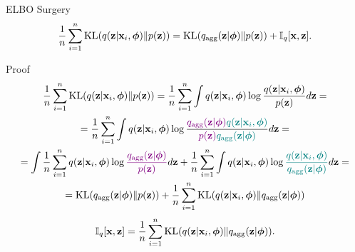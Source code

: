 \documentclass{beamer}
\begin{document}
\begin{frame}{ELBO Surgery}
		\vspace{-0.4cm}
		\[
		    \frac{1}{n} \sum_{i=1}^n \mathrm{KL}(q(\mathbf{z} | \mathbf{x}_i, \boldsymbol{\phi}) \| p(\mathbf{z})) = \mathrm{KL}(q_{\text{agg}}(\mathbf{z} | \boldsymbol{\phi}) \| p(\mathbf{z})) + \mathbb{I}_q [\mathbf{x}, \mathbf{z}].
		\]
		\vspace{-0.3cm}
	\begin{block}{Proof}
		\vspace{-0.5cm}
		{\footnotesize
		\begin{multline*}
		    \frac{1}{n} \sum_{i=1}^n \mathrm{KL}(q(\mathbf{z} | \mathbf{x}_i, \boldsymbol{\phi}) \| p(\mathbf{z})) = \frac{1}{n} \sum_{i=1}^n \int q(\mathbf{z} | \mathbf{x}_i, \boldsymbol{\phi}) \log \frac{q(\mathbf{z} | \mathbf{x}_i, \boldsymbol{\phi})}{p(\mathbf{z})} d \mathbf{z} = \\
		    = \frac{1}{n} \sum_{i=1}^n \int q(\mathbf{z} | \mathbf{x}_i, \boldsymbol{\phi}) \log \frac{{\color{violet}q_{\text{agg}}(\mathbf{z} | \boldsymbol{\phi})} {\color{teal}q(\mathbf{z} | \mathbf{x}_i, \boldsymbol{\phi})}}{{\color{violet}p(\mathbf{z})} {\color{teal}q_{\text{agg}}(\mathbf{z} | \boldsymbol{\phi})}} d \mathbf{z} = \\
		    = \int \frac{1}{n} \sum_{i=1}^n  q(\mathbf{z} | \mathbf{x}_i, \boldsymbol{\phi}) \log {\color{violet}\frac{q_{\text{agg}}(\mathbf{z}| \boldsymbol{\phi})}{p(\mathbf{z})}} d \mathbf{z}
		    + \frac{1}{n}\sum_{i=1}^n \int q(\mathbf{z} | \mathbf{x}_i, \boldsymbol{\phi}) \log {\color{teal}\frac{q(\mathbf{z}| \mathbf{x}_i, \boldsymbol{\phi})}{q_{\text{agg}}(\mathbf{z}| \boldsymbol{\phi})}} d \mathbf{z} = \\
		    = \mathrm{KL} (q_{\text{agg}}(\mathbf{z} | \boldsymbol{\phi}) \| p(\mathbf{z})) + \frac{1}{n}\sum_{i=1}^n \mathrm{KL}(q(\mathbf{z} | \mathbf{x}_i, \boldsymbol{\phi}) \| q_{\text{agg}}(\mathbf{z} | \boldsymbol{\phi}))
		\end{multline*}
		}
		\vspace{-0.4cm}
		\[
			\mathbb{I}_{q} [\mathbf{x}, \mathbf{z}] = \frac{1}{n}\sum_{i=1}^n \mathrm{KL}(q(\mathbf{z} | \mathbf{x}_i, \boldsymbol{\phi}) \| q_{\text{agg}}(\mathbf{z} | \boldsymbol{\phi})).
		\]
	\end{block}
\end{frame}
\end{document}
